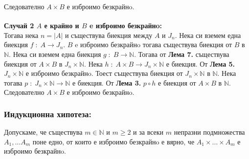 \documentclass[a4paper, 12pt, oneside]{article}
\newcommand{\N}{\mathbb{N}}
\begin{document}
Следователно \(A \times B\) е изброимо безкрайнo. \\
\hfill \\
\bigskip
\textbf{Случай 2 \(A\) е крайно и \(B\) e изброимо безкрайнo:} \\
Тогава нека \(n = |A|\) и съществува биекция между \(A\) и \(J_n\).
Нека си вземем една биекция \(f \; : \; A \to J_n\).
\(B\) e изброимо безкрайнo тогава съществува биекция от \(B\) в \(\N\).
Нека си вземем една биекция \(g \; : \; B \to \N\).
Тогава от \textbf{Лема 7.} съществува биекция от \(A \times B\) в \(J_n \times \N\).
Нека \(h \; : \; A \times B \to J_n \times \N\) е биекция.
От \textbf{Лема 5.} \(J_n \times \N\) е изброимо безкрайнo.
Тоест съществува биекция от \(J_n\times \N\) в \(\N\).
Нека тогава \(p \; : \; J_n \times \N \to \N\) е биекция.
От \textbf{Лема 3.} \(p \circ h\) е биекция от \(A \times B\) в \(\N\).
Следователно \(A \times B\) е изброимо безкрайнo.
\subsubsection*{Индукционна хипотеза:}
Допускаме, че съществува \(m \in \N\) и \(m \geq 2\)
и за всеки \(m\) непразни подмножества \(A_1, \dots A_m\)
поне едно, от които е изброимо безкрайнo е вярно,
че \(A_1 \times \dots \times A_m\) е изброимо безкрайнo. 
\end{document}
